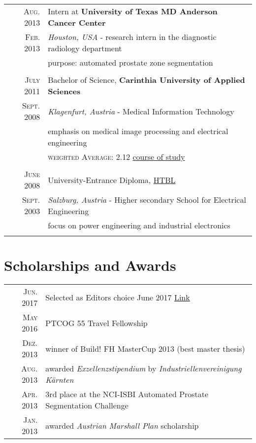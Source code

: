\documentclass[a4paper,10pt]{article}
\begin{document}
\begin{tabular}{rl}
\textsc{Aug.} 2013 & Intern at \textbf{University of Texas MD Anderson Cancer Center}\\
\textsc{Feb.} 2013 &\emph{Houston, USA} - research intern in the diagnostic radiology department\\
& purpose: automated prostate zone segmentation\\
&\\

\textsc{July} 2011 & Bachelor of Science, \textbf{Carinthia University of Applied Sciences}\\
\textsc{Sept.} 2008 &\emph{Klagenfurt, Austria} - Medical Information Technology\\
& emphasis on medical image processing and electrical engineering\\
&\normalsize \textsc{weighted Average}: 2.12 \hspace{10mm}  \href{https://www.fh-kaernten.at/unser-studienangebot/engineering-it/ueberblick/engineering-it/bachelor/informationstechnologien/studiengaenge-informationstechnologien/medizintechnik/}{course of study}\\
&\\


\textsc{June} 2008 & University-Entrance Diploma, \href{http://www.htl-salzburg.ac.at/elektrotechnik.html}{HTBL}\\
\textsc{Sept.} 2003 &\emph{Salzburg, Austria} - Higher secondary School for Electrical Engineering \\
& focus on power engineering and industrial electronics \\

&\\


\end{tabular}

\vspace{.5cm}

\section{Scholarships and Awards}

\begin{tabular}{rl}
\textsc{Jun.} 2017 & Selected as Editors choice June 2017 \href{http://onlinelibrary.wiley.com/doi/10.1002/mp.12251/full}{Link}\\
\textsc{May} 2016 & PTCOG 55 Travel Fellowship\\
\textsc{Dez.} 2013 & winner of Build! FH MasterCup 2013 (best master thesis)\\
\textsc{Aug.} 2013 & awarded \emph{Exzellenzstipendium} by \emph{Industriellenvereinigung K{\"a}rnten}\\ %
\textsc{Apr.} 2013 & 3rd place at the NCI-ISBI Automated Prostate Segmentation Challenge\\
\textsc{Jan.} 2013 & awarded \emph{Austrian Marshall Plan} scholarship\\ %
\end{tabular}
\end{document}
